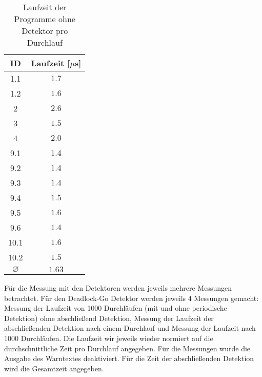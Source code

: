 \begin{table}[H]
    \centering
\begin{tabular}{|c|c|}
\hline
ID   & Laufzeit [$\mu$s]   \\ \hline
1.1  & $1.7$ \\ \hline
1.2  & $1.6$       \\ \hline
2    & $2.6$        \\ \hline
3    & $1.5$        \\ \hline
4    & $2.0$        \\ \hline
9.1  & $1.4$        \\ \hline
9.2  & $1.4$       \\ \hline
9.3  & $1.4$        \\ \hline
9.4  & $1.5$        \\ \hline
9.5  & $1.6$        \\ \hline
9.6  & $1.4$        \\ \hline
10.1 & $1.6$        \\ \hline
10.2 & $1.5$        \\ \hline
$\varnothing$ & $1.63$ \\ \hline 
\end{tabular}
\caption{Laufzeit der Programme ohne Detektor pro Durchlauf}
\end{table}
Für die Messung mit den Detektoren werden jeweils 
mehrere Messungen betrachtet. Für den Deadlock-Go Detektor werden jeweils 4
Messungen gemacht: Messung der Laufzeit von 1000 Durchläufen (mit und ohne 
periodische Detektion) ohne abschließend Detektion, Messung der Laufzeit der abschließenden Detektion nach 
einem Durchlauf und Messung der Laufzeit nach 1000 Durchläufen. Die Laufzeit
wir jeweils wieder normiert auf die durchschnittliche Zeit pro Durchlauf angegeben.
Für die Messungen wurde die Ausgabe des Warntextes deaktiviert.
Für die Zeit der abschließenden Detektion wird die Gesamtzeit angegeben.
